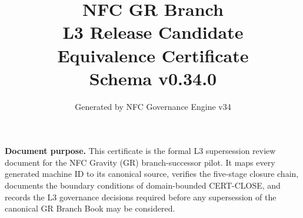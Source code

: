 \documentclass[11pt]{article}
\title{NFC GR Branch\\L3 Release Candidate\\Equivalence Certificate\\[1ex]
  \large Schema v0.34.0}
\author{Generated by NFC Governance Engine v34}
\date{}
\begin{document}
\maketitle
\tableofcontents
\bigskip
\noindent\textbf{Document purpose.}
This certificate is the formal L3 supersession review document for the
NFC Gravity (GR) branch-successor pilot. It maps every generated machine ID
to its canonical source, verifies the five-stage closure chain, documents the
boundary conditions of domain-bounded CERT-CLOSE, and records the L3
governance decisions required before any supersession of the canonical GR
Branch Book may be considered.
\vspace{1em}

\end{document}
